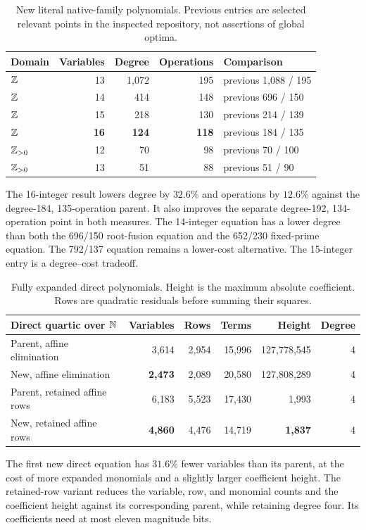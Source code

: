 \begin{table}[ht]
\centering\small
\begin{tabular}{@{}lrrrl@{}}
\toprule
Domain & Variables & Degree & Operations & Comparison\\
\midrule
$\mathbb Z$ & 13 & 1,072 & 195 & previous 1,088 / 195\\
$\mathbb Z$ & 14 & 414 & 148 & previous 696 / 150\\
$\mathbb Z$ & 15 & 218 & 130 & previous 214 / 139\\
$\mathbb Z$ & \textbf{16} & \textbf{124} & \textbf{118} & previous 184 / 135\\
$\mathbb Z_{>0}$ & 12 & 70 & 98 & previous 70 / 100\\
$\mathbb Z_{>0}$ & 13 & 51 & 88 & previous 51 / 90\\
\bottomrule
\end{tabular}
\caption{New literal native-family polynomials. Previous entries are selected
relevant points in the inspected repository, not assertions of global optima.}
\end{table}
The 16-integer result lowers degree by $32.6\%$ and operations by $12.6\%$
against the degree-184, 135-operation parent. It also improves the separate
degree-192, 134-operation point in both measures. The 14-integer equation
has a lower degree than both the 696/150 root-fusion equation and the
652/230 fixed-prime equation. The 792/137 equation remains a lower-cost
alternative. The 15-integer entry is a degree--cost tradeoff.

\begin{table}[ht]
\centering\small
\begin{tabular}{@{}lrrrrr@{}}
\toprule
Direct quartic over $\mathbb N$ & Variables & Rows & Terms & Height & Degree\\
\midrule
Parent, affine elimination & 3,614 & 2,954 & 15,996 & 127,778,545 & 4\\
New, affine elimination & \textbf{2,473} & 2,089 & 20,580 & 127,808,289 & 4\\
Parent, retained affine rows & 6,183 & 5,523 & 17,430 & 1,993 & 4\\
New, retained affine rows & \textbf{4,860} & 4,476 & 14,719 & \textbf{1,837} & 4\\
\bottomrule
\end{tabular}
\caption{Fully expanded direct polynomials. Height is the maximum absolute
coefficient. Rows are quadratic residuals before summing their squares.}
\end{table}
The first new direct equation has $31.6\%$ fewer variables than its parent,
at the cost of more expanded monomials and a slightly larger coefficient
height. The retained-row variant reduces the variable, row, and monomial
counts and the coefficient height against its corresponding parent,
while retaining degree four. Its coefficients need at most eleven magnitude bits.

